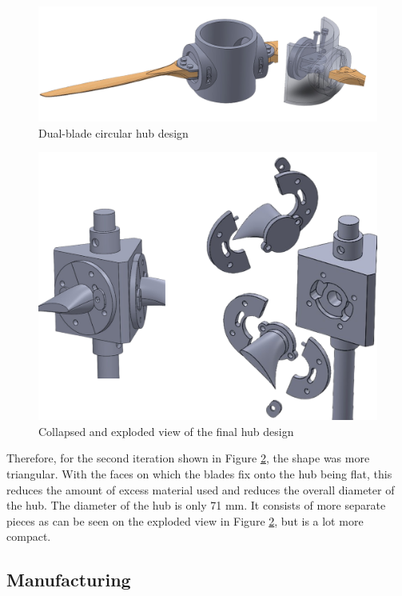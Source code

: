 \begin{figure}[!htbp]
    \centering
    \includegraphics[width=\linewidth]{images/part7/iter2.png}
    \caption{Dual-blade circular hub design}
    \label{fig:iter2}
\end{figure}

\begin{figure}[!htbp]
    \centering
    \includegraphics{images/part7/explodedhub.png}
    \caption{Collapsed and exploded view of the final hub design}
    \label{fig:explodedview}
\end{figure}

Therefore, for the second iteration shown in Figure \ref{fig:explodedview}, the shape was more triangular. With the faces on which the blades fix onto the hub being flat, this reduces the amount of excess material used and reduces the overall diameter of the hub. The diameter of the hub is only 71 mm. It consists of more separate pieces as can be seen on the exploded view in Figure \ref{fig:explodedview}, but is a lot more compact.

\subsection{Manufacturing}

